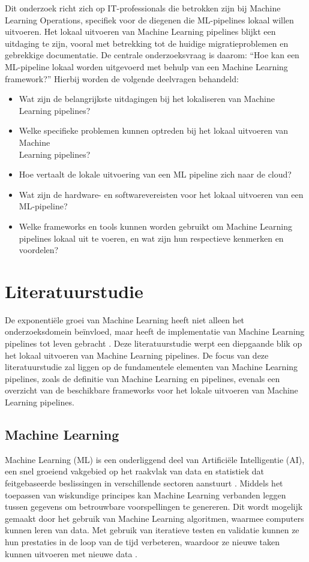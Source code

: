 Dit onderzoek richt zich op IT-professionals die betrokken zijn bij Machine Learning Operations, specifiek voor de diegenen die ML-pipelines lokaal willen uitvoeren.
Het lokaal uitvoeren van Machine Learning pipelines blijkt een uitdaging te zijn, vooral met betrekking tot de huidige migratieproblemen en gebrekkige documentatie.
De centrale onderzoeksvraag is daarom: ``Hoe kan een ML-pipeline lokaal worden uitgevoerd met behulp van een Machine Learning framework?''
Hierbij worden de volgende deelvragen behandeld:
\begin{itemize}
  \item Wat zijn de belangrijkste uitdagingen bij het lokaliseren van Machine Learning pipelines?
  \item Welke specifieke problemen kunnen optreden bij het lokaal uitvoeren van Machine\\ Learning pipelines?
  \item Hoe vertaalt de lokale uitvoering van een ML pipeline zich naar de cloud?
  \item Wat zijn de hardware- en softwarevereisten voor het lokaal uitvoeren van een ML-pipeline?
  \item Welke frameworks en tools kunnen worden gebruikt om Machine Learning pipelines lokaal uit te voeren, en wat zijn hun respectieve kenmerken en voordelen?
\end{itemize}



\section{Literatuurstudie}%
\label{sec:state-of-the-art}

De exponentiële groei van Machine Learning heeft niet alleen het onderzoeksdomein beïnvloed, maar heeft de implementatie van Machine Learning pipelines tot leven gebracht \autocite{Aggarwal2022}.
Deze literatuurstudie werpt een diepgaande blik op het lokaal uitvoeren van Machine Learning pipelines.
De focus van deze literatuurstudie zal liggen op de fundamentele elementen van Machine Learning pipelines, zoals de definitie van Machine Learning en pipelines, evenals een overzicht van de beschikbare frameworks voor het lokale uitvoeren van Machine Learning pipelines.
\subsection{Machine Learning}
Machine Learning (ML) is een onderliggend deel van Artificiële Intelligentie (AI), een snel groeiend vakgebied op het raakvlak van data en statistiek dat feitgebaseerde beslissingen in verschillende sectoren aanstuurt \autocite{Jordan2015}.
Middels het toepassen van wiskundige principes kan Machine Learning verbanden leggen tussen gegevens om betrouwbare voorspellingen te genereren. Dit wordt mogelijk gemaakt door het gebruik van Machine Learning algoritmen, waarmee computers kunnen leren van data. Met gebruik van iteratieve testen en validatie kunnen ze hun prestaties in de loop van de tijd verbeteren, waardoor ze nieuwe taken kunnen uitvoeren met nieuwe data \autocite{Shaveta2023}.
